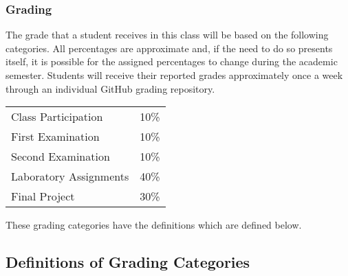 \documentclass[11pt]{article} %
\begin{document}
\subsubsection*{\textbf{Grading}}

The grade that a student receives in this class will be based on the following categories. All percentages are approximate and, if the need to do so presents itself, it is possible for the assigned percentages to change during the academic semester. Students will receive their reported grades approximately once a week through an individual GitHub grading repository.

\color{red}
\begin{center}
  \begin{tabular}{l|l}
\hline

   Class Participation & 10\% \\  
    First Examination & 10\% \\
    Second Examination & 10\% \\
    Laboratory  Assignments & 40\% \\
    Final Project & 30\% \\

\hline
  \end{tabular}
\end{center}
\color{black}
\noindent
These grading categories have the definitions which are defined below.


\noindent
\subsection*{\textbf{Definitions of Grading Categories}}
\vspace*{-.05in}
\end{document}
